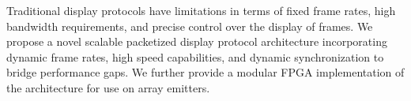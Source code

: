 Traditional display protocols have limitations in terms of fixed frame rates, high bandwidth requirements, and precise control over the display of frames. We propose a novel scalable packetized display protocol architecture incorporating dynamic frame rates, high speed capabilities, and dynamic synchronization to bridge performance gaps. We further provide a modular FPGA implementation of the architecture for use on array emitters.
